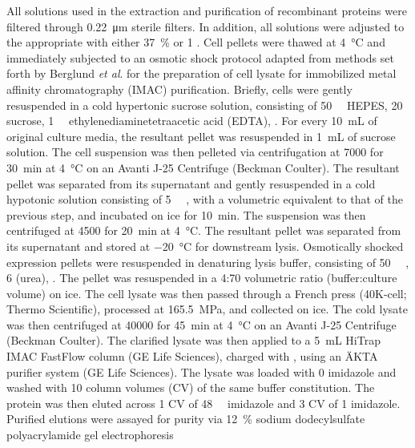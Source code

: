 \begin{refsection}
All solutions used in the extraction and purification of recombinant proteins
were filtered through \SI{0.22}{\um} sterile filters. In addition, all solutions
were adjusted to the appropriate \pH with either \SI{37}{\percent}  or
\SI{1}{\moLar} . Cell pellets were thawed at \SI{4}{\celsius} and
immediately subjected to an osmotic shock protocol adapted from methods set forth
by Berglund \emph{et al}.  for the preparation of cell lysate for immobilized
metal affinity chromatography (IMAC)
purification.\cite{Neu1965,Bae2000,Magnusdottir2009} Briefly, cells were gently
resuspended in a cold hypertonic sucrose solution, consisting of
\SI{50}{\milli\moLar} HEPES, \SI{20}{\wtper} sucrose, \SI{1}{\milli\moLar}
ethylenediaminetetraacetic acid (EDTA), . For every \SI{10}{\mL} of
original culture media, the resultant pellet was resuspended in \SI{1}{\mL} of
sucrose solution. The cell suspension was then pelleted via centrifugation at
\SI{7000}{\gforce} for \SI{30}{\minute} at \SI{4}{\celsius} on an Avanti J-25
Centrifuge (Beckman Coulter). The resultant pellet was separated from its
supernatant and gently resuspended in a cold hypotonic solution consisting of
\SI{5}{\milli\moLar} , with a volumetric equivalent to that of the
previous step, and incubated on ice for \SI{10}{\minute}. The suspension was
then centrifuged at \SI{4500}{\gforce} for \SI{20}{\minute} at \SI{4}{\celsius}.
The resultant pellet was separated from its supernatant and stored at
\SI{-20}{\celsius} for downstream lysis. 
Osmotically shocked expression pellets were resuspended in denaturing lysis
buffer, consisting of \SI{50}{\milli\moLar} , \SI{6}{\moLar}
 (urea), . The pellet was resuspended in a 4:70 volumetric ratio
(buffer:culture volume) on ice. The cell lysate was then passed through a French
press (40K-cell; Thermo Scientific), processed at \SI{165.5}{\MPa}, and
collected on ice. The cold lysate was then centrifuged at \SI{40000}{\gforce}
for \SI{45}{\minute} at \SI{4}{\celsius} on an Avanti J-25 Centrifuge (Beckman
Coulter). The clarified lysate was then applied to a \SI{5}{\mL} HiTrap IMAC
FastFlow column (GE Life Sciences), charged with , using an \"{A}KTA
purifier system (GE Life Sciences). The lysate was loaded with \SI{0}{\moLar}
imidazole and washed with 10 column volumes (CV) of the same buffer
constitution. The protein was then eluted across 1 CV of \SI{48}{\milli\moLar}
imidazole and 3 CV of \SI{1}{\moLar} imidazole.  Purified elutions were assayed
for purity via \SI{12}{\percent} sodium dodecylsulfate polyacrylamide gel electrophoresis

\end{refsection}
